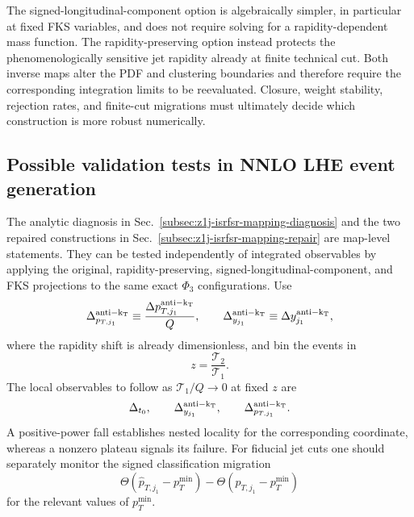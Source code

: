 \documentclass[11pt]{article}
\newcommand{\Ph}{\Phi}
\begin{document}
The signed-longitudinal-component option is algebraically simpler, in particular at fixed FKS variables, and
does not require solving for a rapidity-dependent mass function.  The rapidity-preserving option instead
protects the phenomenologically sensitive jet rapidity already at finite technical cut.  Both inverse maps
alter the PDF and clustering boundaries and therefore require the corresponding integration limits to be
reevaluated.  Closure, weight stability, rejection rates, and finite-cut migrations must ultimately decide
which construction is more robust numerically.

\subsection{Possible validation tests in NNLO LHE event generation}
\label{subsec:z1j-nnlo-lhe-mapping-tests}

The analytic diagnosis in Sec.~\ref{subsec:z1j-isrfsr-mapping-diagnosis} and the two repaired constructions in
Sec.~\ref{subsec:z1j-isrfsr-mapping-repair} are map-level statements.  They can be tested independently of
integrated observables by applying the original, rapidity-preserving, signed-longitudinal-component, and FKS
projections to the same exact $\Ph_3$ configurations.  Use
\[
\Delta_{p_{T,j_1}}^{\rm anti-k_T}
\equiv
\frac{\Delta p_{T,j_1}^{\rm anti-k_T}}{Q},
\qquad
\Delta_{y_{j_1}}^{\rm anti-k_T}
\equiv
\Delta y_{j_1}^{\rm anti-k_T},
\]
where the rapidity shift is already dimensionless, and bin the events in
\begin{equation}
z=\frac{\mathcal T_2}{\mathcal T_1}.
\label{eq:z1j-z-diagnostic}
\end{equation}
The local observables to follow as $\mathcal T_1/Q\to0$ at fixed $z$ are
\begin{equation}
\Delta_{t_0},
\qquad
\Delta_{y_{j_1}}^{\rm anti-k_T},
\qquad
\Delta_{p_{T,j_1}}^{\rm anti-k_T}.
\label{eq:z1j-local-diagnostics}
\end{equation}
A positive-power fall establishes nested locality for the corresponding coordinate, whereas a nonzero
plateau signals its failure.  For fiducial jet cuts one should separately monitor the signed classification
migration
\begin{equation}
\Theta\!\left(\widehat p_{T,j_1}-p_T^{\min}\right)
-
\Theta\!\left(p_{T,j_1}-p_T^{\min}\right)
\label{eq:z1j-signed-threshold-migration}
\end{equation}
for the relevant values of $p_T^{\min}$.
\end{document}
